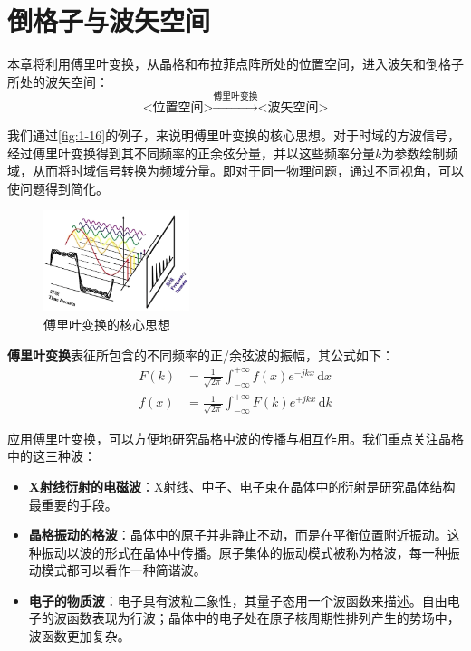 \chapter{倒格子与波矢空间}\label{chap:2}
    本章将利用傅里叶变换，从晶格和布拉菲点阵所处的位置空间，进入波矢和倒格子所处的波矢空间：
    \[
        \mbox{<位置空间>}\xrightarrow{\mbox{傅里叶变换}}\mbox{<波矢空间>} 
    \]

    我们通过\autoref{fig:1-16}的例子，来说明傅里叶变换的核心思想。对于时域的方波信号，经过傅里叶变换得到其不同频率的正余弦分量，并以这些频率分量$k$为参数绘制频域，从而将时域信号转换为频域分量。即对于同一物理问题，通过不同视角，可以使问题得到简化。

    \begin{figure}[!htbp]
        \centering    
        \includegraphics[height=8em, keepaspectratio=true]{pic/2-01}
        \caption{傅里叶变换的核心思想}
        \label{fig:1-16}
    \end{figure}

    \textbf{傅里叶变换}表征所包含的不同频率的正/余弦波的振幅，其公式如下：
    \begin{align}\label{eq:2.1}
        F(k)&=\frac{1}{\sqrt{2\pi}}\int_{-\infty}^{+\infty} f(x)e^{-jkx} \,\mathrm{d}x\\
        f(x)&=\frac{1}{\sqrt{2\pi}}\int_{-\infty}^{+\infty} F(k)e^{+jkx} \,\mathrm{d}k 
    \end{align}
           
    应用傅里叶变换，可以方便地研究晶格中波的传播与相互作用。我们重点关注晶格中的这三种波：
    \begin{itemize}[itemsep=0pt,parsep=0pt]
        \item \textbf{X射线衍射的电磁波}：X射线、中子、电子束在晶体中的衍射是研究晶体结构最重要的手段。
        \item \textbf{晶格振动的格波}：晶体中的原子并非静止不动，而是在平衡位置附近振动。这种振动以波的形式在晶体中传播。原子集体的振动模式被称为格波，每一种振动模式都可以看作一种简谐波。
        \item \textbf{电子的物质波}：电子具有波粒二象性，其量子态用一个波函数来描述。自由电子的波函数表现为行波；晶体中的电子处在原子核周期性排列产生的势场中，波函数更加复杂。
    \end{itemize}

